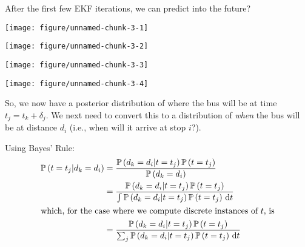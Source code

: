 \documentclass[11pt]{article}\usepackage[]{graphicx}\usepackage[]{color}
\newenvironment{knitrout}{}{} %
\newcommand{\pr}{\mathbb{P}}
\renewcommand{\Pr}[1]{\pr\left(#1\right)}
\begin{document}
After the first few EKF iterations, we can predict into the future?

\begin{knitrout}
\color{fgcolor}

{\centering \texttt{[image: figure/unnamed-chunk-3-1]} 

}




{\centering \texttt{[image: figure/unnamed-chunk-3-2]} 

}




{\centering \texttt{[image: figure/unnamed-chunk-3-3]} 

}




{\centering \texttt{[image: figure/unnamed-chunk-3-4]} 

}



\end{knitrout}




So, we now have a posterior distribution of where the bus will be at time $t_j = t_k + \delta_j$.
We next need to convert this to a distribution of \emph{when} the bus will be at distance $d_i$
(i.e., when will it arrive at stop $i$?).

Using Bayes' Rule:
\begin{align*}
   \Pr{t = t_j | d_k = d_i}
  &= \frac{\Pr{d_k = d_i | t = t_j} \Pr{t = t_j}}{\Pr{d_k = d_i}} \\
  &= \frac{\Pr{d_k = d_i | t = t_j} \Pr{t = t_j}}{\int\Pr{d_k = d_i | t = t_j} \Pr{t = t_j}\,\mathrm{d}t} \\
  \intertext{which, for the case where we compute discrete instances of $t$, is}
  &= \frac{\Pr{d_k = d_i | t = t_j} \Pr{t = t_j}}{\sum_j\Pr{d_k = d_i | t = t_j} \Pr{t = t_j}\,\mathrm{d}t} \\
\end{align*}
\end{document}
